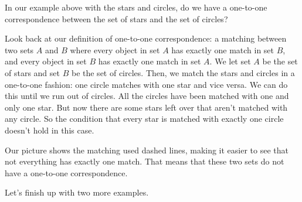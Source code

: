 \documentclass{ximera}
\begin{document}
\begin{question}
In our example above with the stars and circles, do we have a one-to-one correspondence between the set of stars and the set of circles?
\begin{image}
\end{image}
\begin{multipleChoice}
\end{multipleChoice}
\begin{explanation}
	Look back at our definition of one-to-one correspondence: a matching between two sets $A$ and $B$ where every object in set $A$ has exactly one match in set $B$, and every object in set $B$ has exactly one match in set $A$. We let set $A$ be the set of stars and set $B$ be the set of circles. Then, we match the stars and circles in a one-to-one fashion: one circle matches with one star and vice versa. We can do this until we run out of circles. All the circles have been matched with one and only one star. But now there are some stars left over that aren't matched with any circle. So the condition that every star is matched with exactly one circle doesn't hold in this case.
\begin{image}
\end{image}
Our picture shows the matching used dashed lines, making it easier to see that not everything has exactly one match. That means that these two sets do not have a one-to-one correspondence.
\end{explanation}
\end{question}

Let's finish up with two more examples.
\end{document}
